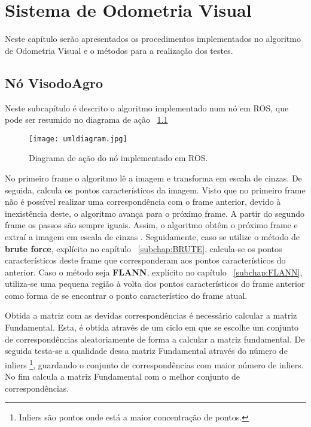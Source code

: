 \chapter{Sistema de Odometria Visual} \label{chap:sist}

Neste capítulo serão apresentados os procedimentos implementados no algoritmo de Odometria Visual e o métodos para a realização dos testes.


\section{Nó VisodoAgro}

Neste subcapítulo é descrito o algoritmo implementado num nó em ROS, que pode ser resumido no diagrama de ação ~\ref{fig:diaguml}

\begin{figure}[h!] %
	\begin{center}
		\leavevmode		
		\texttt{[image: umldiagram.jpg]}
		\caption{Diagrama de ação do nó implementado em ROS.}
		\label{fig:diaguml}
	\end{center}
\end{figure}



No primeiro frame o algoritmo lê a imagem e transforma em escala de cinzas. De seguida, calcula os pontos característicos da imagem. Visto que no primeiro frame não é possível realizar uma correspondência com o frame anterior, devido à inexistência deste, o algoritmo avança para o próximo frame. A partir do segundo frame os passos são sempre iguais. Assim, o algoritmo obtêm o próximo frame e extraí a imagem em escala de cinzas . Seguidamente, caso se utilize o método de \textbf{brute force}, explícito no capítulo ~\ref{subchap:BRUTE}, calcula-se os pontos característicos deste frame que corresponderam aos pontos característicos do anterior. Caso o método seja \textbf{FLANN}, explícito no capítulo ~\ref{subchap:FLANN}, utiliza-se uma pequena região à volta dos pontos característicos do frame anterior como forma de se encontrar o ponto característico do frame atual. 


Obtida a matriz com as devidas correspondências é necessário calcular a matriz Fundamental. Esta, é obtida através de um ciclo em que se escolhe um conjunto de correspondências aleatoriamente de forma a calcular a matriz fundamental. De seguida testa-se a qualidade dessa matriz Fundamental através do número de inliers \footnote{Inliers são pontos onde está a maior concentração de pontos.}, guardando o conjunto de correspondências com maior número de inliers. No fim calcula a matriz Fundamental com o melhor conjunto de correspondências.

